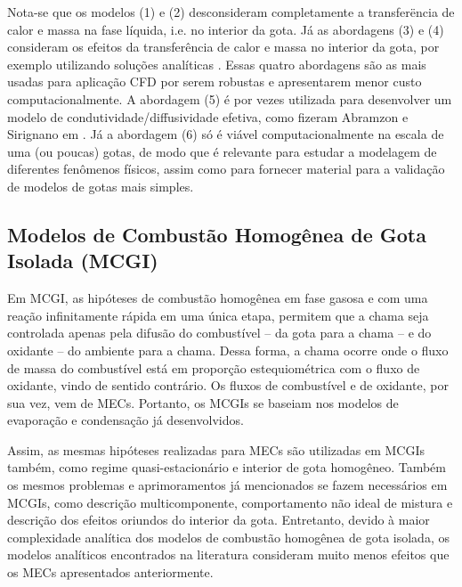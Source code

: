 Nota-se que os modelos (1) e (2) desconsideram completamente a transferëncia de calor e massa na fase líquida, i.e. no interior da gota.
Já as abordagens (3) e (4) consideram os efeitos da transferência de calor e massa no interior da gota, por exemplo utilizando soluções analíticas \cite{ZanuttoC2019}.
Essas quatro abordagens são as mais usadas para aplicação CFD por serem robustas e apresentarem menor custo computacionalmente. 
A abordagem (5) é por vezes utilizada para desenvolver um modelo de condutividade/diffusividade efetiva, como fizeram Abramzon e Sirignano em \cite{Sirignano1989}.
Já a abordagem (6) só é viável computacionalmente na escala de uma (ou poucas) gotas, de modo que é relevante para estudar a modelagem de diferentes fenômenos físicos, assim como para fornecer material para a validação de modelos de gotas mais simples.




\subsection{Modelos de Combustão Homogênea de Gota Isolada (MCGI)} \label{sec:MCGI}

Em MCGI, as hipóteses de combustão homogênea em fase gasosa e com uma reação infinitamente rápida em uma única etapa, permitem que a chama seja controlada apenas pela difusão do combustível -- da gota para a chama -- e do oxidante -- do ambiente para a chama.
Dessa forma, a chama ocorre onde o fluxo de massa do combustível está em proporção estequiométrica com o fluxo de oxidante, vindo de sentido contrário. 
Os fluxos de combustível e de oxidante, por sua vez, vem de MECs.
Portanto, os MCGIs se baseiam nos modelos de evaporação e condensação já desenvolvidos.

Assim, as mesmas hipóteses realizadas para MECs são utilizadas em MCGIs também, como regime quasi-estacionário e interior de gota homogêneo.
Também os mesmos problemas e aprimoramentos já mencionados se fazem necessários em MCGIs, como descrição multicomponente, comportamento não ideal de mistura e  
descrição dos efeitos oriundos do interior da gota.
Entretanto, devido à maior complexidade analítica dos modelos de combustão homogênea de gota isolada, os modelos analíticos encontrados na literatura consideram muito menos efeitos que os MECs apresentados anteriormente.


